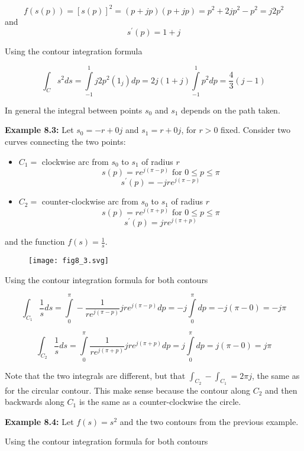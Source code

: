\documentclass{article}
\begin{document}
\[
f\left(s(p)\right) = [s(p)]^2 = (p + jp)(p + jp) = p^2 + 2jp^2 -p^2 = j2p^2
\]
and
\[
s^\prime(p) = 1 + j
\]

Using the contour integration formula

\[
\int_C s^2 ds = \int\limits_{-1}^{1} j2p^2(1_j) dp = 2j(1+j) \int\limits_{-1}^{1} p^2 dp = \frac{4}{3} (j-1) 
\]

In general the integral between points $s_0$ and $s_1$ depends on the path taken.

\textbf{Example 8.3:} Let $s_0 = -r + 0j$ and $s_1 = r + 0j$, for $r > 0$ fixed. Consider two curves connecting the two points:

\begin{itemize}
\item $C_1 = $ clockwise arc from $s_0$ to $s_1$ of radius $r$
  \[
  s(p) = re^{j(\pi - p)} \text{ for } 0 \leq p \leq \pi  
  \]
  \[
  s^\prime(p) = -jre^{j(\pi - p)}
  \]
\item $C_2 = $ counter-clockwise arc from $s_0$ to $s_1$ of radius $r$
  \[
  s(p) = re^{j(\pi + p)} \text{ for } 0 \leq p \leq \pi
  \]
  \[
  s^\prime(p) = jre^{j(\pi + p)}
  \]
\end{itemize}

and the function $f(s) = \frac{1}{s}$.

\begin{figure}
  \centering
  \texttt{[image: fig8\_3.svg]}
\end{figure}

Using the contour integration formula for both contours

\[
\int_{C_1} \frac{1}{s} ds = \int\limits_{0}^{\pi} - \frac{1}{re^{j(\pi - p)}} jre^{j(\pi - p)} dp =  -j \int\limits_{0}^{\pi} dp = -j(\pi - 0) = - j\pi
\]

\[
\int_{C_2}  \frac{1}{s} ds = \int\limits_{0}^{\pi} \frac{1}{re^{j(\pi + p)}} jre^{j(\pi + p)}  dp =  j \int\limits_{0}^{\pi} dp = j(\pi - 0) = j\pi
\]

Note that the two integrals are different, but that $\int_{C_2} - \int_{C_1} = 2\pi j$, the same as for the circular contour. This make sense because the contour along $C_2$ and then backwards along $C_1$ is the same as a counter-clockwise the circle.

\textbf{Example 8.4:} Let $f(s) = s^2$ and the two contours from the previous example.

Using the contour integration formula for both contours
\end{document}
